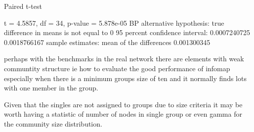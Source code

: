 	Paired t-test


t = 4.5857, df = 34, p-value = 5.878e-05 BP
alternative hypothesis: true difference in means is not equal to 0
95 percent confidence interval:
 0.0007240725 0.0018766167
sample estimates:
mean of the differences 
            0.001300345 

perhaps with the benchmarks in the real network there are elements with weak communtity structure ie how to evaluate the good performance of infomap especially when there is a minimum groups size of ten and it normally finds lots with one member in the group.    

Given that the singles are not assigned to groups due to size criteria it may be worth having a statistic of number of nodes in single group or even gamma for the community size distribution.

